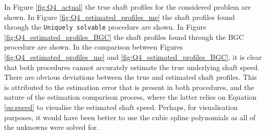 \documentclass{article}
\begin{document}
	In Figure \ref{fig:Q4_actual} the true shaft profiles for the considered problem are shown. In Figure \ref{fig:Q4_estimated_profiles_me} the shaft profiles found through the \texttt{Uniquely solvable} procedure are shown. In Figure \ref{fig:Q4_estimated_profiles_BGC} the shaft profiles found through the BGC procedure are shown. In the comparison between Figures \ref{fig:Q4_estimated_profiles_me} and \ref{fig:Q4_estimated_profiles_BGC}, it is clear that both procedures cannot accurately estimate the true underlying shaft speed. There are obvious deviations between the true and estimated shaft profiles. This is attributed to the estimation error that is present in both procedures, and the nature of the estimation comparison process, where the latter relies on Equation \eqref{eq:speed} to visualise the estimated shaft speed. Perhaps, for visualisation purposes, it would have been better to use the cubic spline polynomials as all of the unknowns were solved for.
\end{document}
